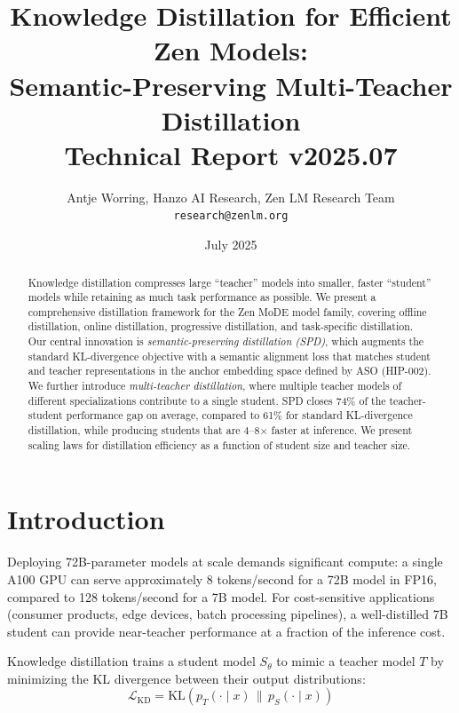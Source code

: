 \documentclass[11pt,a4paper]{article}
\title{\textbf{Knowledge Distillation for Efficient Zen Models:\\
Semantic-Preserving Multi-Teacher Distillation}\\
\large Technical Report v2025.07}
\author{Antje Worring, Hanzo AI Research, Zen LM Research Team\\
\texttt{research@zenlm.org}}
\date{July 2025}
\begin{document}
\maketitle

\begin{abstract}
Knowledge distillation compresses large ``teacher'' models into smaller, faster
``student'' models while retaining as much task performance as possible. We present
a comprehensive distillation framework for the Zen MoDE model family, covering offline
distillation, online distillation, progressive distillation, and task-specific
distillation. Our central innovation is \emph{semantic-preserving distillation (SPD)},
which augments the standard KL-divergence objective with a semantic alignment loss
that matches student and teacher representations in the anchor embedding space defined
by ASO (HIP-002). We further introduce \emph{multi-teacher distillation}, where
multiple teacher models of different specializations contribute to a single student.
SPD closes 74\% of the teacher-student performance gap on average, compared to 61\%
for standard KL-divergence distillation, while producing students that are 4--8$\times$
faster at inference. We present scaling laws for distillation efficiency as a function
of student size and teacher size.
\end{abstract}

\tableofcontents
\newpage

\section{Introduction}
\label{sec:intro}

Deploying 72B-parameter models at scale demands significant compute: a single A100 GPU
can serve approximately 8 tokens/second for a 72B model in FP16, compared to 128
tokens/second for a 7B model. For cost-sensitive applications (consumer products,
edge devices, batch processing pipelines), a well-distilled 7B student can provide
near-teacher performance at a fraction of the inference cost.

Knowledge distillation \cite{hinton2015distilling} trains a student model $S_\theta$
to mimic a teacher model $T$ by minimizing the KL divergence between their output
distributions:
\begin{equation}
    \mathcal{L}_{\text{KD}} = \text{KL}(p_T(\cdot \mid x) \,\|\, p_S(\cdot \mid x))
    \label{eq:kd}
\end{equation}
\end{document}
